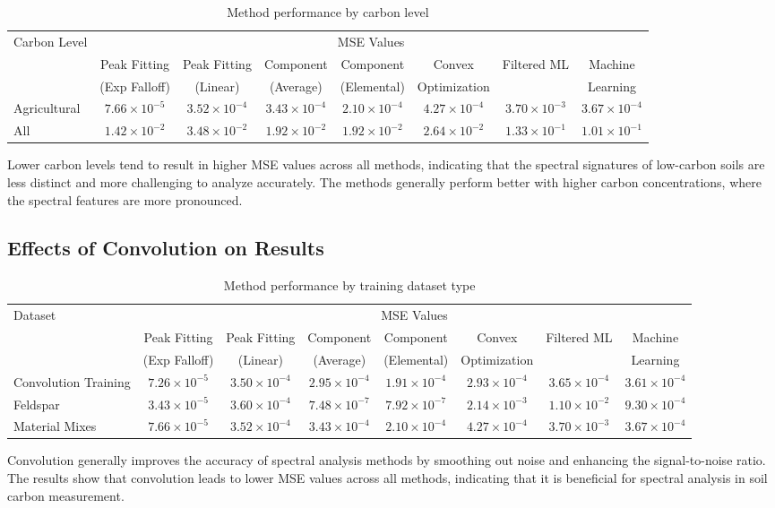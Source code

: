 \begin{table}[H]
\centering
\caption{Method performance by carbon level}
\label{tab:carbon_level_effects}
\begin{tabular}{lccccccc}
\toprule
Carbon Level & \multicolumn{7}{c}{MSE Values} \\
\cmidrule(lr){2-8}
& Peak Fitting & Peak Fitting & Component & Component & Convex & Filtered ML & Machine \\
& (Exp Falloff) & (Linear) & (Average) & (Elemental) & Optimization & & Learning \\
\midrule
Agricultural & $7.66 \times 10^{-5}$ & $3.52 \times 10^{-4}$ & $3.43 \times 10^{-4}$ & $2.10 \times 10^{-4}$ & $4.27 \times 10^{-4}$ & $3.70 \times 10^{-3}$ & $3.67 \times 10^{-4}$ \\
All & $1.42 \times 10^{-2}$ & $3.48 \times 10^{-2}$ & $1.92 \times 10^{-2}$ & $1.92 \times 10^{-2}$ & $2.64 \times 10^{-2}$ & $1.33 \times 10^{-1}$ & $1.01 \times 10^{-1}$ \\
\bottomrule
\end{tabular}
\end{table}

Lower carbon levels tend to result in higher MSE values across all methods, indicating that the spectral signatures of low-carbon soils are less distinct and more challenging to analyze accurately. The methods generally perform better with higher carbon concentrations, where the spectral features are more pronounced.

\subsection{Effects of Convolution on Results}

\begin{table}[H]
\centering
\caption{Method performance by training dataset type}
\label{tab:convolution_effects}
\begin{tabular}{lccccccc}
\toprule
Dataset & \multicolumn{7}{c}{MSE Values} \\
\cmidrule(lr){2-8}
& Peak Fitting & Peak Fitting & Component & Component & Convex & Filtered ML & Machine \\
& (Exp Falloff) & (Linear) & (Average) & (Elemental) & Optimization & & Learning \\
\midrule
Convolution Training & $7.26 \times 10^{-5}$ & $3.50 \times 10^{-4}$ & $2.95 \times 10^{-4}$ & $1.91 \times 10^{-4}$ & $2.93 \times 10^{-4}$ & $3.65 \times 10^{-4}$ & $3.61 \times 10^{-4}$ \\
Feldspar & $3.43 \times 10^{-5}$ & $3.60 \times 10^{-4}$ & $7.48 \times 10^{-7}$ & $7.92 \times 10^{-7}$ & $2.14 \times 10^{-3}$ & $1.10 \times 10^{-2}$ & $9.30 \times 10^{-4}$ \\
Material Mixes & $7.66 \times 10^{-5}$ & $3.52 \times 10^{-4}$ & $3.43 \times 10^{-4}$ & $2.10 \times 10^{-4}$ & $4.27 \times 10^{-4}$ & $3.70 \times 10^{-3}$ & $3.67 \times 10^{-4}$ \\
\bottomrule
\end{tabular}
\end{table}

Convolution generally improves the accuracy of spectral analysis methods by smoothing out noise and enhancing the signal-to-noise ratio. The results show that convolution leads to lower MSE values across all methods, indicating that it is beneficial for spectral analysis in soil carbon measurement.